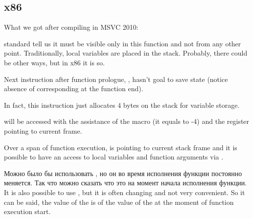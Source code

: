 ﻿\subsection{x86}

{What we got after compiling in MSVC 2010:}




{\CCpp standard tell us it must be visible only in this function and not from any other point. 
Traditionally, local variables are placed in the stack. 
Probably, there could be other ways, but in x86 it is so.}

{Next instruction after function prologue, , hasn't goal to save \ECX state 
(notice absence of corresponding  at the function end).}

{In fact, this instruction just allocates 4 bytes on the stack for  variable storage.} 

{ will be accessed with the assistance of the  macro 
(it equals to -4) and the \EBP register pointing to current frame.}

{Over a span of function execution, \EBP is pointing to current stack frame and it is possible 
to have an access to local variables and function arguments via .}

\IFRU
{Можно было бы использовать \ESP, но он во время исполнения функции постоянно меняется. 
Так что можно сказать что \EBP это  \ESP на момент начала исполнения функции.}
{It is also possible to use \ESP, but it is often changing and not very convenient.
So it can be said, the value of the \EBP is  of the value of the \ESP at the moment of function execution start.}

